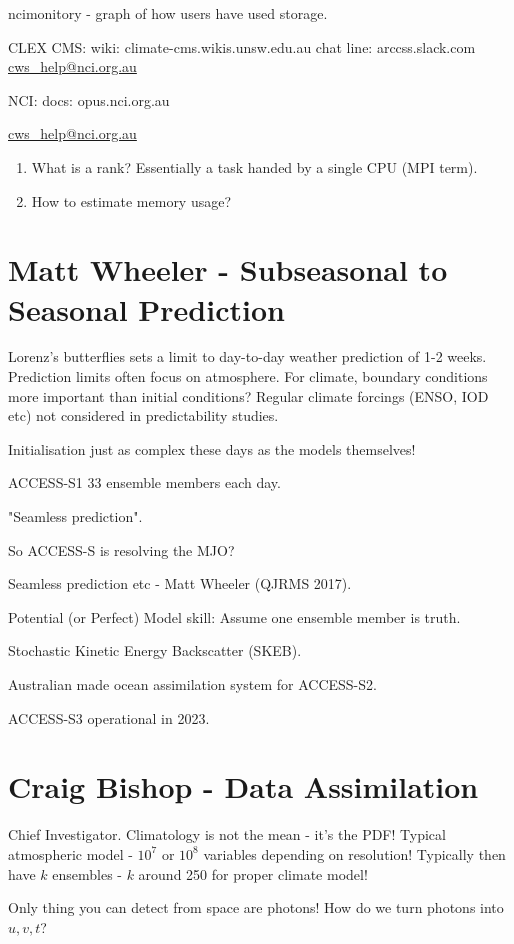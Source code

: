 \documentclass[12pt]{article}
\begin{document}
ncimonitory - graph of how users have used storage. 

CLEX CMS: 
wiki: climate-cms.wikis.unsw.edu.au
chat line: arccss.slack.com
\url{cws_help@nci.org.au}

NCI:
docs: opus.nci.org.au

\url{cws_help@nci.org.au}

\begin{enumerate}
\item
What is a rank? Essentially a task handed by a single CPU (MPI term). 
\item
How to estimate memory usage?
\end{enumerate}

\section{Matt Wheeler - Subseasonal to Seasonal Prediction}
Lorenz's butterflies sets a limit to day-to-day weather prediction of 1-2 weeks. Prediction limits often focus on atmosphere. For climate, boundary conditions more important than initial conditions? Regular climate forcings (ENSO, IOD etc) not considered in predictability studies. 

Initialisation just as complex these days as the models themselves!

ACCESS-S1 33 ensemble members each day.

"Seamless prediction".

So ACCESS-S is resolving the MJO?

Seamless prediction etc - Matt Wheeler (QJRMS 2017).

Potential (or Perfect) Model skill: Assume one ensemble member is truth.

Stochastic Kinetic Energy Backscatter (SKEB). 

Australian made ocean assimilation system for ACCESS-S2. 

ACCESS-S3 operational in 2023.

\section{Craig Bishop - Data Assimilation}
Chief Investigator. Climatology is not the mean - it's the PDF! Typical atmospheric model - $10^7$ or $10^8$ variables depending on resolution! Typically then have $k$ ensembles - $k$ around 250 for proper climate model! 

Only thing you can detect from space are photons! How do we turn photons into $u,v,t$?
\end{document}
